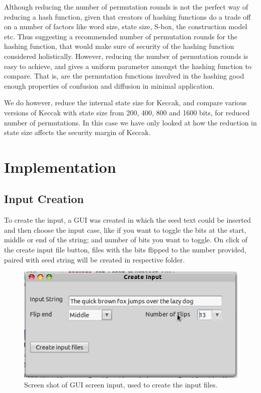 Although reducing the number of permutation rounds is not the perfect way of reducing a hash function, given 
that creators of hashing functions do a trade off on a number of factors like word size, state size, S-box,
the construction model etc. Thus suggesting a recommended number of permutation rounds for the hashing function,
that would make sure of security of the hashing function considered holistically. However, reducing the number
of permutation rounds is easy to achieve, and gives a uniform parameter amongst the hashing function to compare.
That is, are the permutation functions involved in the hashing good enough properties of confusion and
diffusion in minimal application.

We do however, reduce the internal state size for Keccak, and compare various versions of Keccak with state size
from 200, 400, 800 and 1600 bits, for reduced number of permutations. In this case we have only looked at how
the reduction in state size affects the security margin of Keccak.

\section{Implementation}

\subsection{Input Creation}

To create the input, a GUI was created in which the seed text could be inserted and then choose the input case,
like if you want to toggle the bits at the start, middle or end of the string; and number of bits you want
to toggle. On click of the create input file button, files with the bits flipped to the number provided, paired
with seed string will be created in respective folder.

\begin{figure}
  \begin{center}
    \includegraphics[width=5.2in]{inputcreationscreenshot.png}
  \end{center}
  \caption{Screen shot of GUI screen input, used to create the input files.}
  \label{fig:screenshotinputcreation}
\end{figure}

